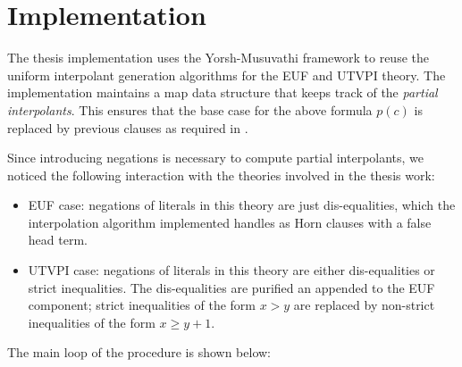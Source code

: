 \section{Implementation}

The thesis implementation uses the Yorsh-Musuvathi framework to reuse the 
uniform interpolant generation algorithms for the EUF
and UTVPI theory.
The implementation maintains a map data structure that 
keeps track of the \emph{partial interpolants}. This ensures
that the base case for the above formula $p(c)$ is replaced
by previous clauses as required in \cite{10.1007/11532231_26}.

Since introducing negations is necessary to compute partial interpolants,
we noticed the following interaction with the theories involved in the
thesis work:

\begin{itemize}
  \item EUF case: negations of literals in this theory are just
    dis-equalities, which the interpolation algorithm implemented
    handles as Horn clauses with a false head term.
  \item UTVPI case: negations of literals in this theory are either
    dis-equalities or strict inequalities. The dis-equalities are purified
    an appended to the EUF component; strict inequalities of the form
    $x > y$ are replaced by non-strict inequalities of the 
    form $x \geq y + 1$.
\end{itemize}

The main loop of the procedure is shown below:

